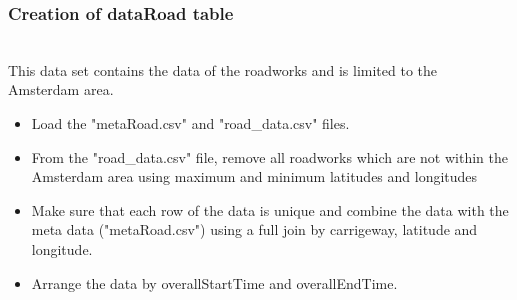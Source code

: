 \documentclass[sigconf]{acmart}
\begin{document}
\subsubsection{Creation of dataRoad table}\hspace*{\fill} \\
This data set contains the data of the roadworks and is limited to the Amsterdam area.
\begin{itemize}
    \item Load the "metaRoad.csv" and "road\_data.csv" files.
    \item From the "road\_data.csv" file, remove all roadworks which are not within the Amsterdam area using maximum and minimum latitudes and longitudes
    \item Make sure that each row of the data is unique and combine the data with the meta data ("metaRoad.csv") using a full join by carrigeway, latitude and longitude.
    \item Arrange the data by overallStartTime and overallEndTime.
\end{itemize}
\end{document}
